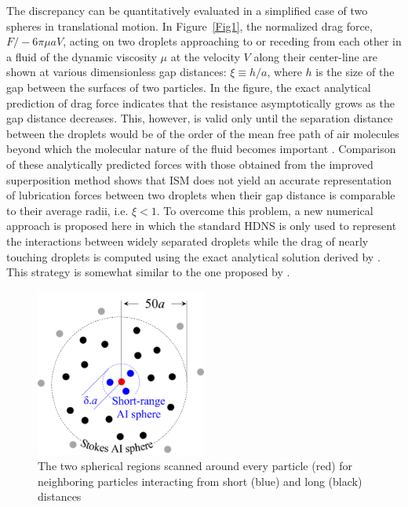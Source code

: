 \documentclass[../thesis.tex]{subfiles}
\begin{document}
The discrepancy can be quantitatively evaluated in a simplified case of two spheres in translational motion. In Figure~\ref{Fig1}, the normalized drag force, $F/-6\pi\mu a V$, acting on two droplets approaching to or receding from each other in a fluid of the dynamic viscosity $\mu$ at the velocity $V$ along their center-line are shown at various dimensionless gap distances: $\xi \equiv h/a$, where $h$ is the size of the gap between the surfaces of two particles.  In the figure, the exact analytical prediction of drag force \citep{JO84} indicates that the resistance asymptotically grows as the gap distance decreases. This, however, is valid only until the separation distance between the droplets would be of the order of the mean free path of air molecules beyond which the molecular nature of the fluid becomes important \citep{SK96}. Comparison of these analytically predicted forces with those obtained from the improved superposition method \citep{WAG05} shows that ISM does not yield an accurate representation of lubrication forces between two droplets when their gap distance is comparable to their average radii, i.e. $\xi < 1$. To overcome this problem, a new numerical approach is proposed here in which the standard HDNS is only used to represent the interactions between widely separated droplets while the drag of nearly touching droplets is computed using the exact analytical solution derived by \citet{JO84}. This strategy is somewhat similar to the one proposed by \citet[Equation 2.18 therein]{DBB87}.


\begin{figure}%
\centering
\includegraphics[width=0.5\textwidth]{./figs/PPAM/2/CP022_fig2.png}
\caption{The two spherical regions scanned around every particle (red) for neighboring particles interacting from short (blue) and long (black) distances}
\label{method}
\end{figure}%
\end{document}
